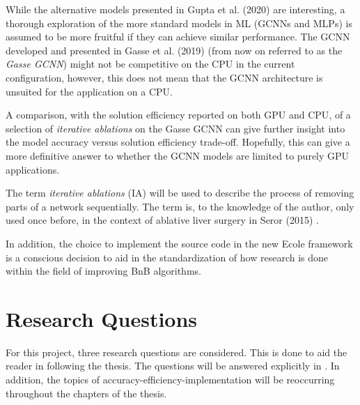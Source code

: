 While the alternative models presented in Gupta et al. (2020) \cite{gupta2020hybrid} are interesting, a thorough exploration of the more standard models in \gls{ML} (\gls{GCNN}s and \gls{MLP}s) is assumed to be more fruitful if they can achieve similar performance. The \gls{GCNN} developed and presented in Gasse et al. (2019) (from now on referred to as the \textit{Gasse \gls{GCNN}}) might not be competitive on the \gls{CPU} in the current configuration, however, this does not mean that the \gls{GCNN} architecture is unsuited for the application on a \gls{CPU}.

A comparison, with the solution efficiency reported on both \gls{GPU} and \gls{CPU}, of a selection of \textit{iterative ablations} on the Gasse \gls{GCNN} can give further insight into the model accuracy versus solution efficiency trade-off. Hopefully, this can give a more definitive answer to whether the \gls{GCNN} models are limited to purely \gls{GPU} applications. 

The term \textit{iterative ablations} (\Gls{IA}) will be used to describe the process of removing parts of a network sequentially. The term is, to the knowledge of the author, only used once before, in the context of ablative liver surgery in Seror (2015) \cite{seror2015ablative}. 

In addition, the choice to implement the source code in the new \gls{Ecole} framework is a conscious decision to aid in the standardization of how research is done within the field of improving \gls{BnB} algorithms.  


\section{Research Questions}\label{sec:questions}

For this project, three research questions are considered. This is done to aid the reader in following the thesis. The questions will be answered explicitly in . In addition, the topics of accuracy-efficiency-implementation will be reoccurring throughout the chapters of the thesis. 

